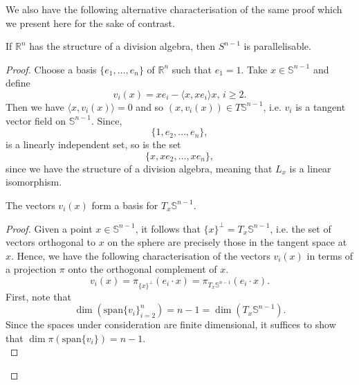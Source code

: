 \documentclass[12pt,a4paper]{article}
\begin{document}
We also have the following alternative characterisation of the same proof which we present here for the sake of contrast.
\begin{theorem}
If $\mathbb{R}^n$ has the structure of a division algebra, then $S^{n-1}$ is parallelisable.
\end{theorem}
\begin{proof}
Choose a basis $\{e_1,\ldots,e_n\}$ of $\mathbb{R}^n$ such that $e_1=1$. Take $x\in\mathbb{S}^{n-1}$ and define
\begin{equation}
v_i(x)=xe_i-\langle x,xe_i\rangle x,\,i\geq 2.
\label{eq:vi-orig}
\end{equation}
Then we have $\langle x,v_i(x)\rangle =0$ and so $(x,v_i(x))\in T\mathbb{S}^{n-1}$, i.e. $v_i$ is a tangent vector field on $\mathbb{S}^{n-1}$. Since,
\[
\{1,e_2,\ldots,e_n\},
\]
is a linearly independent set, so is the set
\[
\{x,xe_2,\ldots,xe_n\},
\]
since we have the structure of a division algebra, meaning that $L_x$ is a linear isomorphism.

\begin{proposition}
The vectors $v_i(x)$ form a basis for $T_x\mathbb{S}^{n-1}$.
\end{proposition}
\begin{proof}
Given a point $x\in\mathbb{S}^{n-1}$, it follows that $\{x\}^\bot=T_x\mathbb{S}^{n-1}$, i.e. the set of vectors orthogonal to $x$ on the sphere are precisely those in the tangent space at $x$.
Hence, we have the following characterisation of the vectors $v_i(x)$ in terms of a projection $\pi$ onto the orthogonal complement of $x$.
\[
v_i(x)=\pi_{\{x\}^\bot}(e_i\cdot x)=\pi_{T_x\mathbb{S}^{n-1}}(e_i\cdot x).
\]
First, note that 
\[
\dim\left(\mathrm{span}\{v_i\}_{i=2}^n\right)=n-1=\dim\left(T_x\mathbb{S}^{n-1}\right).
\]
Since the spaces under consideration are finite dimensional, it suffices to show that $\dim \pi(\mathrm{span}\{v_i\}) =n-1$.\\


\end{proof}
\end{proof}
\end{document}
